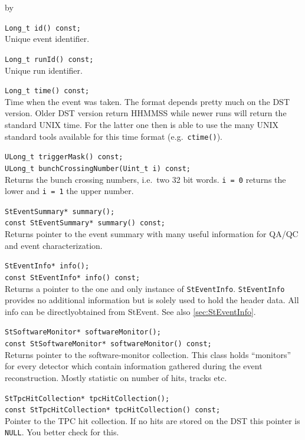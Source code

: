 \documentclass[twoside]{article}
\newcommand{\entrylabel}[1]{\mbox{\textbf{{#1}}}\hfil}%
\newenvironment{entry}
{\begin{list}{}%
    {\renewcommand{\makelabel}{\entrylabel}%
     \setlength{\labelwidth}{90pt}%
     \setlength{\leftmargin}{\labelwidth}
     \advance\leftmargin by \labelsep%
      }%
    }%
  {\end{list}}
\newcommand{\Entrylabel}[1]%
{\raisebox{0pt}[1ex][0pt]{\makebox[\labelwidth][l]%
    {\parbox[t]{\labelwidth}{\hspace{0pt}\textbf{{#1}}}}}}
\newenvironment{Entry}%
{\renewcommand{\entrylabel}{\Entrylabel}\begin{entry}}%
  {\end{entry}}
\begin{document}
\begin{Entry}
    \verb+Long_t id() const;+\\
    Unique event identifier.
    
    \verb+Long_t runId() const;+\\
    Unique run identifier.
    
    \verb+Long_t time() const;+\\
    Time when the event was taken. The format depends pretty much
    on the DST version. Older DST version return HHMMSS while newer
    runs will return the standard UNIX time. For the latter one then
    is able to use the many UNIX standard tools available for this
    time format (e.g.~\texttt{ctime()}).
    
    \verb+ULong_t triggerMask() const;+\\

    \verb+ULong_t bunchCrossingNumber(Uint_t i) const;+\\       
    Returns the bunch crossing numbers, i.e.~two 32 bit words.
    \texttt{i = 0} returns the lower and \texttt{i = 1} the upper number.

    \verb+StEventSummary* summary();+\\
    \verb+const StEventSummary* summary() const;+\\
    Returns pointer to the event summary with many useful information
    for QA/QC and event characterization.

    \verb+StEventInfo* info();+\\
    \verb+const StEventInfo* info() const;+\\
    Returns a pointer to the one and only instance of \texttt{StEventInfo}.
    \texttt{StEventInfo} provides no additional information but is solely
    used to hold the header data. All info can be directlyobtained  from
    StEvent. See also \ref{sec:StEventInfo}.

    \verb+StSoftwareMonitor* softwareMonitor();+\\
    \verb+const StSoftwareMonitor* softwareMonitor() const;+\\
    Returns pointer to the software-monitor collection. This class
    holds ``monitors'' for every detector which contain information
    gathered during the event reconstruction. Mostly statistic on
    number of hits, tracks etc.
    
    \verb+StTpcHitCollection* tpcHitCollection();+\\
    \verb+const StTpcHitCollection* tpcHitCollection() const;+\\
    Pointer to the TPC hit collection. If no hits are stored on the
    DST this pointer is \texttt{NULL}. You better check for this.
    

\end{Entry}
\end{document}
